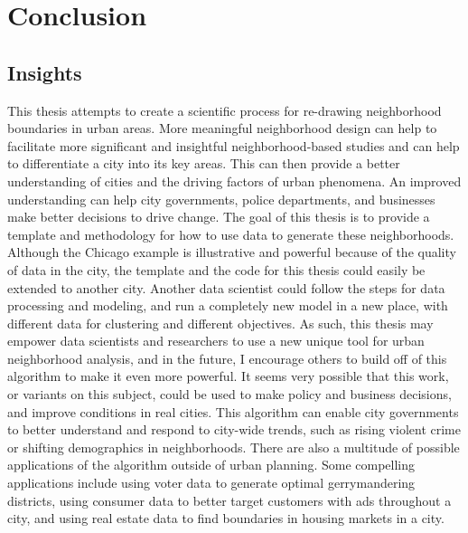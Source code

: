 \documentclass[times new roman,12pt]{article}
\begin{document}
\newpage

\section{Conclusion}

\subsection{Insights}

This thesis attempts to create a scientific process for re-drawing neighborhood boundaries in urban areas. More meaningful neighborhood design can help to facilitate more significant and insightful neighborhood-based studies and can help to differentiate a city into its key areas. This can then provide a better understanding of cities and the driving factors of urban phenomena. An improved understanding can help city governments, police departments, and businesses make better decisions to drive change. The goal of this thesis is to provide a template and methodology for how to use data to generate these neighborhoods. Although the Chicago example is illustrative and powerful because of the quality of data in the city, the template and the code for this thesis could easily be extended to another city. Another data scientist could follow the steps for data processing and modeling, and run a completely new model in a new place, with different data for clustering and different objectives. As such, this thesis may empower data scientists and researchers to use a new unique tool for urban neighborhood analysis, and in the future, I encourage others to build off of this algorithm to make it even more powerful. It seems very possible that this work, or variants on this subject, could be used to make policy and business decisions, and improve conditions in real cities. This algorithm can enable city governments to better understand and respond to city-wide trends, such as rising violent crime or shifting demographics in neighborhoods. There are also a multitude of possible applications of the algorithm outside of urban planning. Some compelling applications include using voter data to generate optimal gerrymandering districts, using consumer data to better target customers with ads throughout a city, and using real estate data to find boundaries in housing markets in a city. 
\end{document}
